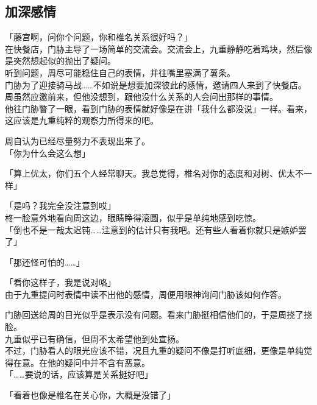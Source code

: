 \subsection{加深感情}

「藤宫啊，问你个问题，你和椎名关系很好吗？」\\

在快餐店，门胁主导了一场简单的交流会。交流会上，九重静静吃着鸡块，然后像是突然想起似的抛出了疑问。\\

听到问题，周尽可能稳住自己的表情，并往嘴里塞满了薯条。\\

门胁为了迎接骑马战……不如说是想要加深彼此的感情，邀请四人来到了快餐店。周虽然应邀前来，但他没想到，跟他没什么关系的人会问出那样的事情。\\

他往门胁瞥了一眼，看到门胁的表情就好像是在讲「我什么都没说」一样。看来，这应该是九重纯粹的观察力所得来的吧。

周自认为已经尽量努力不表现出来了。\\

「你为什么会这么想」

「算上优太，你们五个人经常聊天。我总觉得，椎名对你的态度和对树、优太不一样」

「是吗？我完全没注意到哎」\\

柊一脸意外地看向周这边，眼睛睁得滚圆，似乎是单纯地感到吃惊。\\

「倒也不是一哉太迟钝……注意到的估计只有我吧。还有些人看着你就只是嫉妒罢了」

「那还怪可怕的……」

「看你这样子，我是说对咯」\\

由于九重提问时表情中读不出他的感情，周便用眼神询问门胁该如何作答。

门胁回送给周的目光似乎是表示没有问题。看来门胁挺相信他们的，于是周挠了挠脸。\\

九重似乎已有确信，但周不太希望他到处宣扬。\\

不过，门胁看人的眼光应该不错，况且九重的疑问不像是打听底细，更像是单纯觉得在意。在他的疑问中并不含有恶意。\\

「……要说的话，应该算是关系挺好吧」

「看着也像是椎名在关心你，大概是没错了」

